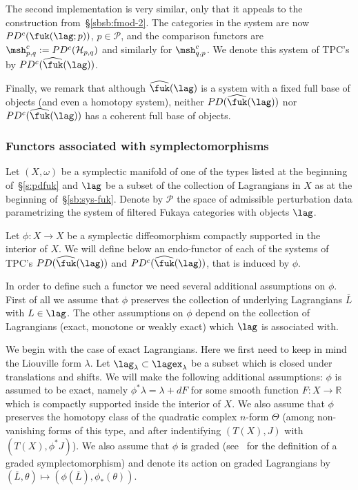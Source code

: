 The second implementation is very similar, only that it appeals to the
construction from~\S\ref{sbsb:fmod-2}. The categories in the system
are now $PD^c(\fuk(\lag;p))$, $p \in \mathcal{P}$, and the comparison
functors are $\msh^c_{p,q} := PD^c(\mathcal{H}_{p,q})$ and similarly
for $\msh^c_{q,p}$. We denote this system of TPC's by
$PD^c(\widehat{\fuk}(\lag))$.

Finally, we remark that although $\widehat{\fuk}(\lag)$ is a system
with a fixed full base of objects (and even a homotopy system),
neither $PD(\widehat{\fuk}(\lag))$ nor $PD^c(\widehat{\fuk}(\lag))$
has a coherent full base of objects.

\subsubsection{Functors associated with
  symplectomorphisms} \label{sbsb:symplecto-fun} Let $(X, \omega)$ be
a symplectic manifold of one of the types listed at the beginning
of~\S\ref{s:pdfuk} and $\lag$ be a subset of the collection of
Lagrangians in $X$ as at the beginning of~\S\ref{sb:sys-fuk}. Denote
by $\mathcal{P}$ the space of admissible perturbation data
parametrizing the system of filtered Fukaya categories with objects
$\lag$.

Let $\phi : X \longrightarrow X$ be a symplectic diffeomorphism
compactly supported in the interior of $X$. We will define below an endo-functor of each of the systems of TPC's $PD(\widehat{\fuk}(\lag))$ and
$PD^c(\widehat{\fuk}(\lag))$, that is induced by $\phi$.

In order to define such a functor we need several additional
assumptions on $\phi$. First of all we assume that $\phi$ preserves
the collection of underlying Lagrangians $\overline{L}$ with
$L \in \lag$. The other assumptions on $\phi$ depend on the collection
of Lagrangians (exact, monotone or weakly exact) which $\lag$ is
associated with.

We begin with the case of exact Lagrangians. Here we first need to
keep in mind the Liouville form $\lambda$. Let
$\lag_{\lambda} \subset \lagex_{\lambda}$ be a subset which is closed
under translations and shifts. We will make the following additional
assumptions: $\phi$ is assumed to be exact, namely
$\phi^*\lambda = \lambda + dF$ for some smooth function
$F: X \longrightarrow \mathbb{R}$ which is compactly supported inside
the interior of $X$. We also assume that $\phi$ preserves the homotopy
class of the quadratic complex $n$-form $\Theta$ (among non-vanishing
forms of this type, and after indentifying $(T(X),J)$ with
$(T(X), \phi^*J)$). We also assume that $\phi$ is graded
(see~\cite{Se:graded} for the definition of a graded
symplectomorphism) and denote its action on graded Lagrangians by
$(\overline{L}, \theta) \longmapsto (\phi(\overline{L}),
\phi_*(\theta))$.

